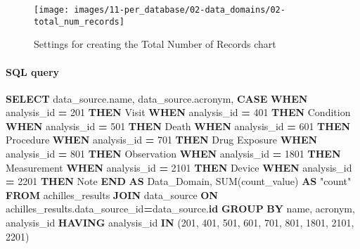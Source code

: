 \documentclass[
]{book}
\newenvironment{Shaded}{\begin{snugshade}}{\end{snugshade}}
\newcommand{\ControlFlowTok}[1]{\textcolor[rgb]{0.13,0.29,0.53}{\textbf{#1}}}
\newcommand{\DecValTok}[1]{\textcolor[rgb]{0.00,0.00,0.81}{#1}}
\newcommand{\FunctionTok}[1]{\textcolor[rgb]{0.00,0.00,0.00}{#1}}
\newcommand{\KeywordTok}[1]{\textcolor[rgb]{0.13,0.29,0.53}{\textbf{#1}}}
\newcommand{\NormalTok}[1]{#1}
\newcommand{\OperatorTok}[1]{\textcolor[rgb]{0.81,0.36,0.00}{\textbf{#1}}}
\newcommand{\OtherTok}[1]{\textcolor[rgb]{0.56,0.35,0.01}{#1}}
\newcommand{\StringTok}[1]{\textcolor[rgb]{0.31,0.60,0.02}{#1}}
\begin{document}
\begin{figure}
\texttt{[image: images/11-per\_database/02-data\_domains/02-total\_num\_records]} \caption{Settings for creating the Total Number of Records chart}\label{fig:totalNumRecords}
\end{figure}

\hypertarget{sql-query-3}{%
\paragraph*{SQL query}\label{sql-query-3}}

\begin{Shaded}
\begin{Highlighting}[]
\KeywordTok{SELECT}
\NormalTok{data\_source.name,}
\NormalTok{data\_source.acronym,}
    \ControlFlowTok{CASE} 
    \ControlFlowTok{WHEN}\NormalTok{ analysis\_id }\OperatorTok{=} \DecValTok{201} \ControlFlowTok{THEN} \StringTok{\textquotesingle{}Visit\textquotesingle{}}
    \ControlFlowTok{WHEN}\NormalTok{ analysis\_id }\OperatorTok{=} \DecValTok{401} \ControlFlowTok{THEN} \StringTok{\textquotesingle{}Condition\textquotesingle{}}
    \ControlFlowTok{WHEN}\NormalTok{ analysis\_id }\OperatorTok{=} \DecValTok{501} \ControlFlowTok{THEN} \StringTok{\textquotesingle{}Death\textquotesingle{}}
    \ControlFlowTok{WHEN}\NormalTok{ analysis\_id }\OperatorTok{=} \DecValTok{601} \ControlFlowTok{THEN} \StringTok{\textquotesingle{}Procedure\textquotesingle{}}
    \ControlFlowTok{WHEN}\NormalTok{ analysis\_id }\OperatorTok{=} \DecValTok{701} \ControlFlowTok{THEN} \StringTok{\textquotesingle{}Drug Exposure\textquotesingle{}}
    \ControlFlowTok{WHEN}\NormalTok{ analysis\_id }\OperatorTok{=} \DecValTok{801} \ControlFlowTok{THEN} \StringTok{\textquotesingle{}Observation\textquotesingle{}}
    \ControlFlowTok{WHEN}\NormalTok{ analysis\_id }\OperatorTok{=} \DecValTok{1801} \ControlFlowTok{THEN} \StringTok{\textquotesingle{}Measurement\textquotesingle{}}
    \ControlFlowTok{WHEN}\NormalTok{ analysis\_id }\OperatorTok{=} \DecValTok{2101} \ControlFlowTok{THEN} \StringTok{\textquotesingle{}Device\textquotesingle{}}
    \ControlFlowTok{WHEN}\NormalTok{ analysis\_id }\OperatorTok{=} \DecValTok{2201} \ControlFlowTok{THEN} \StringTok{\textquotesingle{}Note\textquotesingle{}}
    \ControlFlowTok{END} \KeywordTok{AS}\NormalTok{ Data\_Domain,}
    \FunctionTok{SUM}\NormalTok{(count\_value) }\KeywordTok{AS} \OtherTok{"count"}
\KeywordTok{FROM}\NormalTok{ achilles\_results}
\KeywordTok{JOIN}\NormalTok{ data\_source }\KeywordTok{ON}\NormalTok{ achilles\_results.data\_source\_id}\OperatorTok{=}\NormalTok{data\_source.}\KeywordTok{id}
\KeywordTok{GROUP} \KeywordTok{BY}\NormalTok{ name, acronym, analysis\_id}
\KeywordTok{HAVING}\NormalTok{ analysis\_id }\KeywordTok{IN}\NormalTok{ (}\DecValTok{201}\NormalTok{, }\DecValTok{401}\NormalTok{, }\DecValTok{501}\NormalTok{, }\DecValTok{601}\NormalTok{, }\DecValTok{701}\NormalTok{, }\DecValTok{801}\NormalTok{, }\DecValTok{1801}\NormalTok{, }\DecValTok{2101}\NormalTok{, }\DecValTok{2201}\NormalTok{)}
\end{Highlighting}
\end{Shaded}
\end{document}
